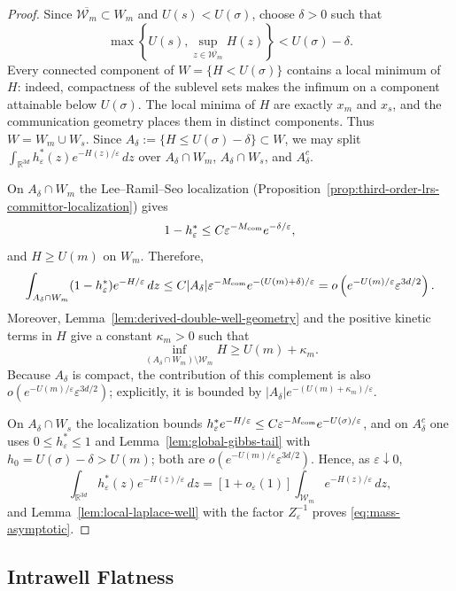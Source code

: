\documentclass[11pt]{article}
\numberwithin{equation}{section}
\theoremstyle{plain}
\theoremstyle{definition}
\theoremstyle{remark}
\newcommand{\R}{\mathbb R}
\newcommand{\eps}{\varepsilon}
\begin{document}
\begin{proof}
Since $\overline{\mathcal W_m}\subset W_m$ and $U(s)<U(\sigma)$, choose
$\delta>0$ such that
\[
\max\left\{U(s),\sup_{z\in\overline{\mathcal W_m}}H(z)\right\}
<U(\sigma)-\delta.
\]
Every connected component of $W=\{H<U(\sigma)\}$ contains a local minimum of
$H$: indeed, compactness of the sublevel sets makes the infimum on a component
attainable below $U(\sigma)$.  The local minima of $H$ are exactly $x_m$ and
$x_s$, and the communication geometry places them in distinct components.
Thus $W=W_m\cup W_s$.  Since
$A_\delta:=\{H\le U(\sigma)-\delta\}\subset W$, we may split
$\int_{\R^{3d}}h_\eps^*(z)e^{-H(z)/\eps}\,dz$
over $A_\delta\cap W_m$, $A_\delta\cap W_s$, and $A_\delta^c$.

On $A_\delta\cap W_m$ the Lee--Ramil--Seo
localization (Proposition~\ref{prop:third-order-lrs-committor-localization})
gives 
\[
1-h_\eps^*\le C\eps^{-M_{\rm com}}e^{-\delta/\eps}, 
\]
and $H\ge U(m)$ on $W_m$. Therefore,
\[
\int_{A_\delta\cap W_m}(1-h_\eps^*)e^{-H/\eps}\,dz
\le C|A_\delta|\eps^{-M_{\rm com}}e^{-(U(m)+\delta)/\eps}
=o\left(e^{-U(m)/\eps}\eps^{3d/2}\right).
\]
Moreover,
Lemma~\ref{lem:derived-double-well-geometry} and the positive kinetic terms in
$H$ give a constant $\kappa_m>0$ such that
\[
\inf_{(A_\delta\cap W_m)\setminus\mathcal W_m}H
\ge U(m)+\kappa_m.
\]
Because $A_\delta$ is compact, the contribution of this complement is also
$o(e^{-U(m)/\eps}\eps^{3d/2})$; explicitly, it is bounded by
$|A_\delta|e^{-(U(m)+\kappa_m)/\eps}$.

On $A_\delta\cap W_s$ the localization bounds
$h_\eps^* e^{-H/\eps}\le C\eps^{-M_{\rm com}}e^{-U(\sigma)/\eps}$, and on $A_\delta^c$
one uses $0\le h_\eps^*\le1$ and
Lemma~\ref{lem:global-gibbs-tail} with
$h_0=U(\sigma)-\delta>U(m)$; both are
$o(e^{-U(m)/\eps}\eps^{3d/2})$.
Hence, as $\eps\downarrow 0$,
\[
\int_{\R^{3d}}h_\eps^*(z)e^{-H(z)/\eps}\,dz
=[1+o_\eps(1)]\int_{\mathcal W_m}e^{-H(z)/\eps}\,dz,
\]
and
Lemma~\ref{lem:local-laplace-well} with the factor $Z_\eps^{-1}$ proves
\eqref{eq:mass-asymptotic}.
\end{proof}

\subsection{Intrawell Flatness}
\label{sec:intrawell-flatness}
\end{document}
